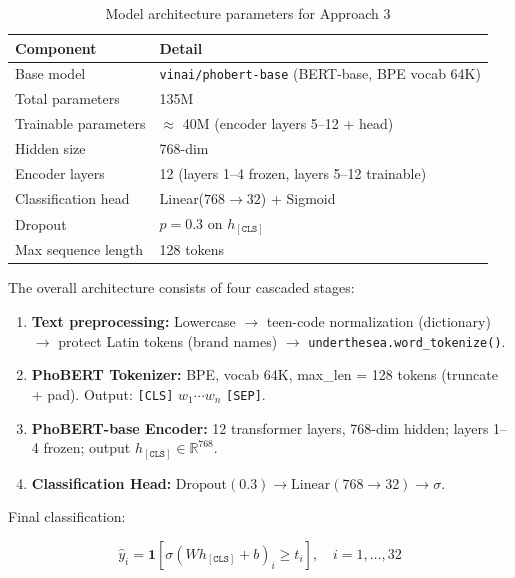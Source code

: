 \documentclass[12pt, a4paper]{report}
\begin{document}
\begin{table}[H]
\centering
\caption{Model architecture parameters for Approach 3}
\label{tab:arch_params}
\begin{tabular}{ll}
\toprule
\textbf{Component} & \textbf{Detail} \\
\midrule
Base model              & \texttt{vinai/phobert-base} (BERT-base, BPE vocab 64K) \\
Total parameters        & 135M \\
Trainable parameters    & $\approx$ 40M (encoder layers 5--12 + head) \\
Hidden size             & 768-dim \\
Encoder layers          & 12 (layers 1--4 frozen, layers 5--12 trainable) \\
Classification head     & Linear($768 \rightarrow 32$) + Sigmoid \\
Dropout                 & $p = 0.3$ on $h_{[\texttt{CLS}]}$ \\
Max sequence length     & 128 tokens \\
\bottomrule
\end{tabular}
\end{table}

The overall architecture consists of four cascaded stages:

\begin{enumerate}
  \item \textbf{Text preprocessing:}
        Lowercase $\rightarrow$ teen-code normalization (dictionary) $\rightarrow$
        protect Latin tokens (brand names) $\rightarrow$
        \texttt{underthesea.word\_tokenize()}.
  \item \textbf{PhoBERT Tokenizer:} BPE, vocab 64K, max\_len = 128 tokens
        (truncate + pad). Output: \texttt{[CLS]} $w_1 \cdots w_n$ \texttt{[SEP]}.
  \item \textbf{PhoBERT-base Encoder:} 12 transformer layers, 768-dim hidden;
        layers 1--4 frozen; output $h_{[\texttt{CLS}]} \in \mathbb{R}^{768}$.
  \item \textbf{Classification Head:}
        $\text{Dropout}(0.3) \rightarrow \text{Linear}(768 \rightarrow 32)
        \rightarrow \sigma$.
\end{enumerate}

Final classification:

\begin{equation}
  \hat{y}_i = \mathbf{1}\!\left[\sigma\!\left(W h_{[\texttt{CLS}]} + b\right)_i \geq t_i\right],
  \quad i = 1, \ldots, 32
\end{equation}
\end{document}
